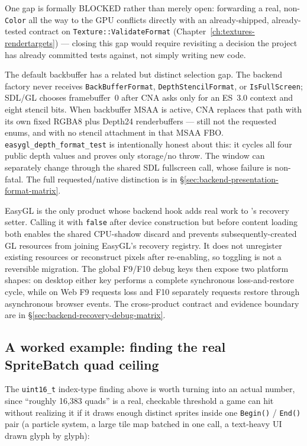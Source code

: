One gap is formally BLOCKED rather than merely open: forwarding a real, non-\texttt{Color}
 all the way to the GPU conflicts directly with an already-shipped,
already-tested contract on \texttt{Texture::ValidateFormat} (Chapter~\ref{ch:textures-rendertargets})
--- closing this gap would require revisiting a decision the project has already committed
tests against, not simply writing new code.

The default backbuffer has a related but distinct selection gap. The backend factory never
receives \texttt{BackBufferFormat}, \texttt{DepthStencilFormat}, or
\texttt{IsFullScreen}; SDL/GL chooses framebuffer~0 after CNA asks only for an ES~3.0 context
and eight stencil bits. When backbuffer MSAA is active, CNA replaces that path with its own
fixed RGBA8 plus Depth24 renderbuffers --- still not the requested enums, and with no stencil
attachment in that MSAA FBO. \texttt{easygl\_depth\_format\_test} is intentionally honest
about this: it cycles all four public depth values and proves only storage/no throw. The
window can separately change through the shared SDL fullscreen call, whose failure is
non-fatal. The full requested/native distinction is in
\S\ref{sec:backend-presentation-format-matrix}.

\begin{sourcenote}
EasyGL is the only product whose backend hook adds real work to
's recovery setter. Calling it with \texttt{false} after device
construction but before content loading both enables the shared
 CPU-shadow discard and prevents subsequently-created GL resources from
joining EasyGL's recovery registry. It does not unregister existing resources or reconstruct
pixels after re-enabling, so toggling is not a reversible migration. The global F9/F10 debug
keys then expose two platform shapes: on desktop either key performs a complete synchronous
loss-and-restore cycle, while on Web F9 requests loss and F10 separately requests restore
through asynchronous browser events. The cross-product contract and evidence boundary are in
\S\ref{sec:backend-recovery-debug-matrix}.
\end{sourcenote}

\subsection{A worked example: finding the real SpriteBatch quad ceiling}

The \texttt{uint16\_t} index-type finding above is worth turning into an actual number, since
``roughly 16{,}383 quads'' is a real, checkable threshold a game can hit without realizing it
if it draws enough distinct sprites inside one \texttt{Begin()} / \texttt{End()} pair (a
particle system, a large tile map batched in one call, a text-heavy UI drawn glyph by glyph):

